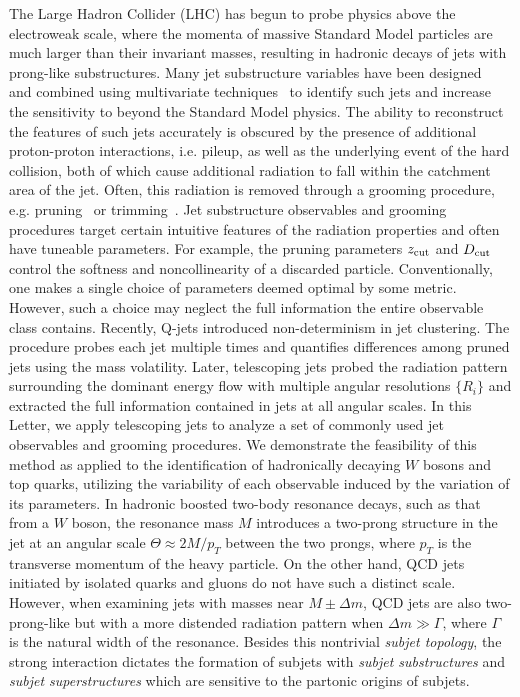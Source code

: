 \documentclass[aps,prl,floatfix,preprintnumbers,twocolumn,groupedaddress,nofootinbib]{revtex4-1}
\begin{document}
The Large Hadron Collider (LHC) has begun to probe physics above the electroweak scale, where the momenta of massive Standard Model particles are much larger than their invariant masses, resulting in hadronic decays of jets with prong-like substructures. Many jet substructure variables have been designed~\cite{Abdesselam:2010pt,Altheimer:2012mn,Altheimer:2013yza} and combined using multivariate techniques~\cite{Adams:2015hiv,Larkoski:2017jix,ATLAS-CONF-2017-064,Khachatryan:1955546} to identify such jets and increase the sensitivity to beyond the Standard Model physics. The ability to reconstruct the features of such jets accurately is obscured by the presence of additional proton-proton interactions, i.e. pileup, as well as the underlying event of the hard collision, both of which cause additional radiation to fall within the catchment area of the jet. Often, this radiation is removed through a grooming procedure, e.g. pruning~\cite{Ellis:2009su} or trimming~\cite{Krohn:2009th}. Jet substructure observables and grooming procedures target certain intuitive features of the radiation properties and often have tuneable parameters. For example, the pruning parameters $z_{\rm cut}$ and $D_{\rm cut}$ control the softness and noncollinearity of a discarded particle. Conventionally, one makes a single choice of parameters deemed optimal by some metric. However, such a choice may neglect the full information the entire observable class contains.
\newline \indent Recently, Q-jets \cite{Ellis:2012sn} introduced non-determinism in jet clustering. The procedure probes each jet multiple times and quantifies differences among pruned jets using the mass volatility. Later, telescoping jets \cite{Chien:2014hla} probed the radiation pattern surrounding the dominant energy flow with multiple angular resolutions $\{R_i\}$ and extracted the full information contained in jets at all angular scales. In this Letter, we apply telescoping jets to analyze a set of commonly used jet observables and grooming procedures. We demonstrate the feasibility of this method as applied to the identification of hadronically decaying $W$ bosons and top quarks, utilizing the variability of each observable induced by the variation of its parameters.
\newline \indent In hadronic boosted two-body resonance decays, such as that from a $W$ boson, the resonance mass $M$ introduces a two-prong structure in the jet at an angular scale $\Theta\approx 2M/p_T$ between the two prongs, where $p_T$ is the transverse momentum of the heavy particle. On the other hand, QCD jets initiated by isolated quarks and gluons do not have such a distinct scale. However, when examining jets with masses near $M\pm\Delta m$, QCD jets are also two-prong-like but with a more distended radiation pattern when $\Delta m\gg\Gamma$, where $\Gamma$ is the natural width of the resonance. Besides this nontrivial {\sl subjet topology}, the strong interaction dictates the formation of subjets with {\sl subjet substructures} and {\sl subjet superstructures} \cite{Gallicchio:2010sw} which are sensitive to the partonic origins of subjets.
\end{document}
